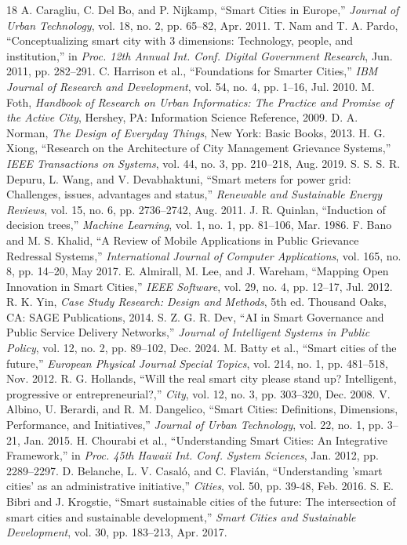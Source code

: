 \documentclass[conference]{IEEEtran}
\begin{document}
\balance
\begin{thebibliography}{18}
 A. Caragliu, C. Del Bo, and P. Nijkamp, ``Smart Cities in Europe,'' \textit{Journal of Urban Technology}, vol. 18, no. 2, pp. 65--82, Apr. 2011.
 T. Nam and T. A. Pardo, ``Conceptualizing smart city with 3 dimensions: Technology, people, and institution,'' in \textit{Proc. 12th Annual Int. Conf. Digital Government Research}, Jun. 2011, pp. 282--291.
 C. Harrison et al., ``Foundations for Smarter Cities,'' \textit{IBM Journal of Research and Development}, vol. 54, no. 4, pp. 1--16, Jul. 2010.
 M. Foth, \textit{Handbook of Research on Urban Informatics: The Practice and Promise of the Active City}, Hershey, PA: Information Science Reference, 2009.
 D. A. Norman, \textit{The Design of Everyday Things}, New York: Basic Books, 2013.
 H. G. Xiong, ``Research on the Architecture of City Management Grievance Systems,'' \textit{IEEE Transactions on Systems}, vol. 44, no. 3, pp. 210--218, Aug. 2019.
 S. S. S. R. Depuru, L. Wang, and V. Devabhaktuni, ``Smart meters for power grid: Challenges, issues, advantages and status,'' \textit{Renewable and Sustainable Energy Reviews}, vol. 15, no. 6, pp. 2736--2742, Aug. 2011.
 J. R. Quinlan, ``Induction of decision trees,'' \textit{Machine Learning}, vol. 1, no. 1, pp. 81--106, Mar. 1986.
 F. Bano and M. S. Khalid, ``A Review of Mobile Applications in Public Grievance Redressal Systems,'' \textit{International Journal of Computer Applications}, vol. 165, no. 8, pp. 14--20, May 2017.
 E. Almirall, M. Lee, and J. Wareham, ``Mapping Open Innovation in Smart Cities,'' \textit{IEEE Software}, vol. 29, no. 4, pp. 12--17, Jul. 2012.
 R. K. Yin, \textit{Case Study Research: Design and Methods}, 5th ed. Thousand Oaks, CA: SAGE Publications, 2014.
 S. Z. G. R. Dev, ``AI in Smart Governance and Public Service Delivery Networks,'' \textit{Journal of Intelligent Systems in Public Policy}, vol. 12, no. 2, pp. 89--102, Dec. 2024.
 M. Batty et al., ``Smart cities of the future,'' \textit{European Physical Journal Special Topics}, vol. 214, no. 1, pp. 481--518, Nov. 2012.
 R. G. Hollands, ``Will the real smart city please stand up? Intelligent, progressive or entrepreneurial?,'' \textit{City}, vol. 12, no. 3, pp. 303--320, Dec. 2008.
 V. Albino, U. Berardi, and R. M. Dangelico, ``Smart Cities: Definitions, Dimensions, Performance, and Initiatives,'' \textit{Journal of Urban Technology}, vol. 22, no. 1, pp. 3--21, Jan. 2015.
 H. Chourabi et al., ``Understanding Smart Cities: An Integrative Framework,'' in \textit{Proc. 45th Hawaii Int. Conf. System Sciences}, Jan. 2012, pp. 2289--2297.
 D. Belanche, L. V. Casaló, and C. Flavián, ``Understanding 'smart cities' as an administrative initiative,'' \textit{Cities}, vol. 50, pp. 39-48, Feb. 2016.
 S. E. Bibri and J. Krogstie, ``Smart sustainable cities of the future: The intersection of smart cities and sustainable development,'' \textit{Smart Cities and Sustainable Development}, vol. 30, pp. 183--213, Apr. 2017.
\end{thebibliography}
\end{document}
